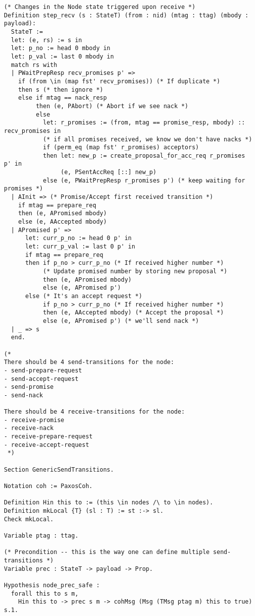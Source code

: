 \begin{landscape}
\begin{multicols*}{2}
\begin{lstlisting}[style=SourceCodeListing]
(* Changes in the Node state triggered upon receive *)
Definition step_recv (s : StateT) (from : nid) (mtag : ttag) (mbody : payload):
  StateT :=
  let: (e, rs) := s in
  let: p_no := head 0 mbody in
  let: p_val := last 0 mbody in
  match rs with
  | PWaitPrepResp recv_promises p' =>
    if (from \in (map fst' recv_promises)) (* If duplicate *)
    then s (* then ignore *)
    else if mtag == nack_resp
         then (e, PAbort) (* Abort if we see nack *)
         else
           let: r_promises := (from, mtag == promise_resp, mbody) :: recv_promises in
           (* if all promises received, we know we don't have nacks *)
           if (perm_eq (map fst' r_promises) acceptors)
           then let: new_p := create_proposal_for_acc_req r_promises p' in
                (e, PSentAccReq [::] new_p)
           else (e, PWaitPrepResp r_promises p') (* keep waiting for promises *)
  | AInit => (* Promise/Accept first received transition *)
    if mtag == prepare_req
    then (e, APromised mbody)
    else (e, AAccepted mbody)
  | APromised p' =>
      let: curr_p_no := head 0 p' in
      let: curr_p_val := last 0 p' in
      if mtag == prepare_req
      then if p_no > curr_p_no (* If received higher number *)
           (* Update promised number by storing new proposal *)
           then (e, APromised mbody)
           else (e, APromised p')
      else (* It's an accept request *)
           if p_no > curr_p_no (* If received higher number *)
           then (e, AAccepted mbody) (* Accept the proposal *)
           else (e, APromised p') (* we'll send nack *)
  | _ => s
  end.

(*
There should be 4 send-transitions for the node:
- send-prepare-request
- send-accept-request
- send-promise
- send-nack

There should be 4 receive-transitions for the node:
- receive-promise
- receive-nack
- receive-prepare-request
- receive-accept-request
 *)

Section GenericSendTransitions.

Notation coh := PaxosCoh.

Definition Hin this to := (this \in nodes /\ to \in nodes).
Definition mkLocal {T} (sl : T) := st :-> sl.
Check mkLocal.

Variable ptag : ttag.

(* Precondition -- this is the way one can define multiple send-transitions *)
Variable prec : StateT -> payload -> Prop.

Hypothesis node_prec_safe :
  forall this to s m,
    Hin this to -> prec s m -> cohMsg (Msg (TMsg ptag m) this to true) s.1.


\end{lstlisting}
\end{multicols*}
\end{landscape}
